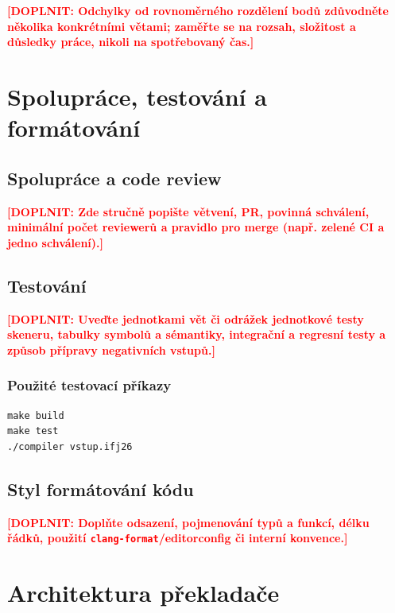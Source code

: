 \documentclass[11pt,a4paper]{article}
\newcommand{\placeholder}[1]{\textcolor{red}{\textbf{[DOPLNIT: #1]}}}
\begin{document}
\placeholder{Odchylky od rovnoměrného rozdělení bodů zdůvodněte několika konkrétními větami; zaměřte se na rozsah, složitost a důsledky práce, nikoli na spotřebovaný čas.}

\section{Spolupráce, testování a formátování}
\subsection{Spolupráce a code review}
\placeholder{Zde stručně popište větvení, PR, povinná schválení, minimální počet reviewerů a pravidlo pro merge (např. zelené CI a jedno schválení).}

\subsection{Testování}
\placeholder{Uveďte jednotkami vět či odrážek jednotkové testy skeneru, tabulky symbolů a sémantiky, integrační a regresní testy a způsob přípravy negativních vstupů.}

\subsubsection{Použité testovací příkazy}
\begin{lstlisting}
make build
make test
./compiler vstup.ifj26
\end{lstlisting}

\subsection{Styl formátování kódu}
\placeholder{Doplňte odsazení, pojmenování typů a funkcí, délku řádků, použití \texttt{clang-format}/editorconfig či interní konvence.}

\section{Architektura překladače}
\end{document}

